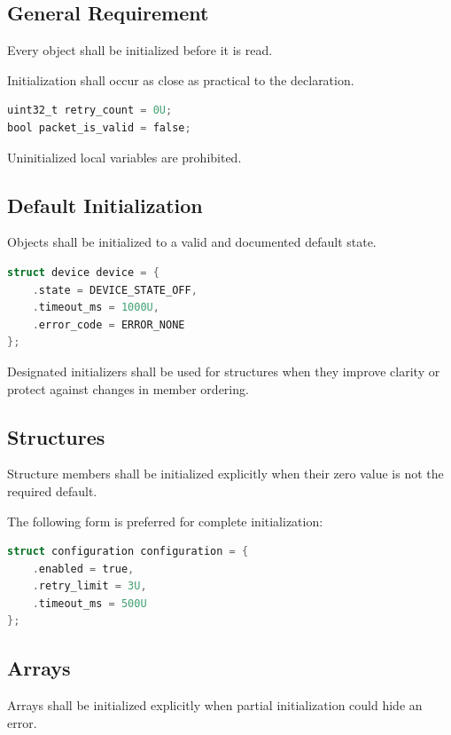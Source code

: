 \subsection{General Requirement}

Every object shall be initialized before it is read.

Initialization shall occur as close as practical to the declaration.

\begin{lstlisting}[language=C]
uint32_t retry_count = 0U;
bool packet_is_valid = false;
\end{lstlisting}

Uninitialized local variables are prohibited.

\subsection{Default Initialization}

Objects shall be initialized to a valid and documented default state.

\begin{lstlisting}[language=C]
struct device device = {
	.state = DEVICE_STATE_OFF,
	.timeout_ms = 1000U,
	.error_code = ERROR_NONE
};
\end{lstlisting}

Designated initializers shall be used for structures when they improve clarity or protect against changes in member ordering.

\subsection{Structures}

Structure members shall be initialized explicitly when their zero value is not the required default.

The following form is preferred for complete initialization:

\begin{lstlisting}[language=C]
struct configuration configuration = {
	.enabled = true,
	.retry_limit = 3U,
	.timeout_ms = 500U
};
\end{lstlisting}

\subsection{Arrays}

Arrays shall be initialized explicitly when partial initialization could hide an error.

